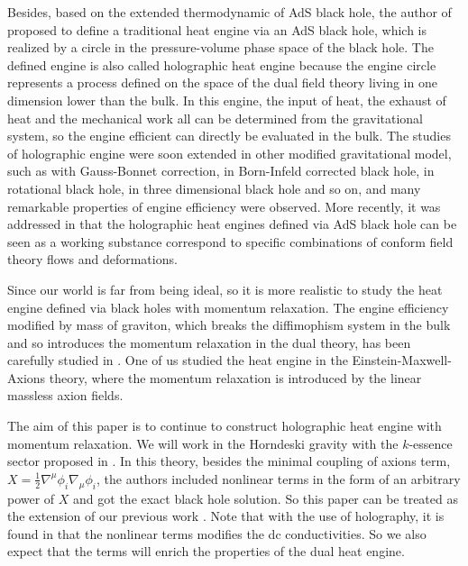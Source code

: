\documentclass[preprint,showpacs,showkeys,onecolumn,nofootinbib]{revtex4}
\begin{document}
Besides, based on the extended thermodynamic of AdS black hole, the author of \cite{Johnson:2014yja} proposed to define a traditional heat engine via an AdS black hole, which is realized by a circle in the pressure-volume phase space of the black hole. The defined engine is also called  holographic heat engine because the engine  circle represents a process defined on the space of the  dual field theory living in one dimension lower than the bulk.  In this engine, the input of heat, the exhaust of heat  and the mechanical work all  can be determined  from the gravitational system, so the engine efficient can directly be evaluated in the bulk.   The studies of holographic engine were soon extended in other modified gravitational model, such as  with Gauss-Bonnet correction\cite{Johnson:2015ekr}, in Born-Infeld corrected black hole\cite{Johnson:2015fva}, in rotational black hole\cite{Hennigar:2017apu,Johnson:2017ood}, in three dimensional black hole\cite{Mo:2017nhw} and so on\cite{Liu:2017baz,Wei:2016hkm,Mo:2018hav,Xu:2017ahm,Zhang:2018vqs}, and  many remarkable properties of engine efficiency  were observed. More recently, it was addressed in \cite{Johnson:2018amj} that the holographic heat engines defined via AdS black hole can be seen as a working substance correspond to specific combinations of conform field theory flows and deformations.

Since our world is far from being ideal, so it is more realistic to study the heat engine defined via black holes with momentum relaxation.  The engine efficiency modified by mass of graviton, which breaks the diffimophism system in the bulk and so  introduces the momentum relaxation in the dual theory\cite{Davison:2013jba},   has been carefully studied in \cite{Mo:2017nes,Hendi:2017bys}. One of us studied  the heat engine in the Einstein-Maxwell-Axions theory\cite{Fang:2017nse}, where the momentum relaxation is introduced by the linear massless axion fields\cite{Andrade:2013gsa}.

The aim of this paper is to continue to construct holographic heat engine with momentum relaxation.  We will work in the Horndeski gravity  with the $k$-essence sector proposed in \cite{Cisterna:2017jmv}.
In this theory, besides the minimal coupling of axions term, $X=\frac12\nabla^{\mu}\phi_{i}\nabla_{\mu}\phi_{i}$, the authors included  nonlinear terms in the form of an arbitrary power of $X$ and got  the exact black hole solution. So this paper can be treated as the extension of our previous work \cite{Fang:2017nse}.
Note that with the use of holography, it is  found in \cite{Cisterna:2017jmv} that the nonlinear terms modifies the dc conductivities. So we also expect that the terms will enrich the properties of the dual heat engine.
\end{document}
